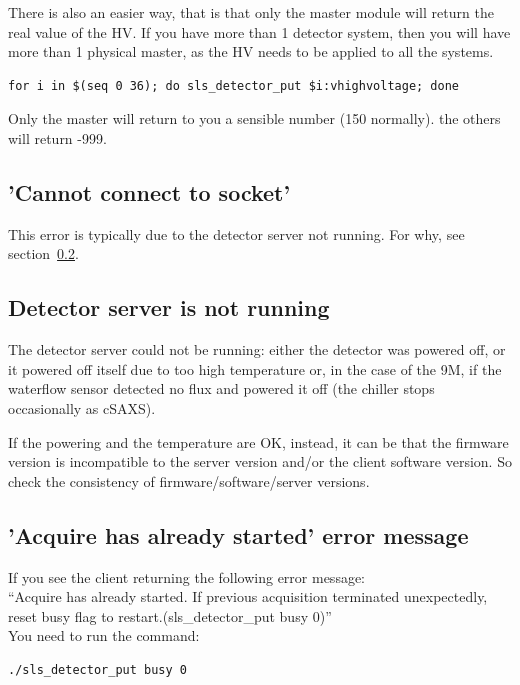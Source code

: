 \documentclass{article}
\begin{document}
There is also an easier way, that is that only the master module will return the real value of the HV. If you have more than 1 detector system, then you will have more than 1 physical master, as the HV needs to be applied to all the systems.

\begin{verbatim}
for i in $(seq 0 36); do sls_detector_put $i:vhighvoltage; done
\end{verbatim}
 Only the master will return to you a sensible number (150 normally). the others will return -999.

\subsection{'Cannot connect to socket'}
This error is typically due to the detector server not running. For why, see section~\ref{servernot}.

\subsection{Detector server is not running}\label{servernot}
The detector server could not be running: either the detector was powered off, or it powered off itself due to too high temperature or, in the case of the 9M, if the waterflow sensor detected no flux and powered it off (the chiller stops occasionally as cSAXS).

If the powering and the temperature are OK, instead, it can be that the firmware version is incompatible to the server version and/or the client software version. So check the consistency of firmware/software/server versions.

\subsection{'Acquire has already started' error message}
If you see the client returning the following error message:\\ 
``Acquire has already started. If previous acquisition terminated unexpectedly, reset busy flag to restart.(sls\_detector\_put busy 0)''\\
 You need to run the command:
\begin{verbatim}
./sls_detector_put busy 0
\end{verbatim}
\end{document}
